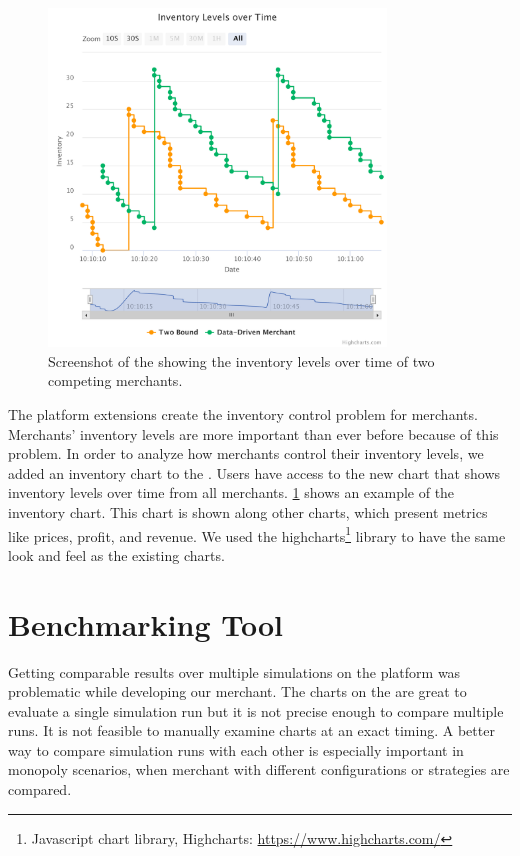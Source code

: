 \begin{figure}[t]
	\centering
	\includegraphics[width=0.8\textwidth]{figures/inventory_graph}
	\caption[Inventory chart on \ui]{Screenshot of the \ui showing the inventory levels over time of two competing merchants.}
	\label{fig:invnetory_graph}
\end{figure}

The platform extensions create the inventory control problem for merchants.
Merchants' inventory levels are more important than ever before because of this problem.
In order to analyze how merchants control their inventory levels, we added an inventory chart to the \ui.
Users have access to the new chart that shows inventory levels over time from all merchants.
\cref{fig:invnetory_graph} shows an example of the inventory chart.
This chart is shown along other charts, which present metrics like prices, profit, and revenue. 
We used the highcharts\footnote{Javascript chart library, Highcharts: \url{https://www.highcharts.com/}} library to have the same look and feel as the existing charts.

\section{Benchmarking Tool}
\label{section:benchmark_tool}
Getting comparable results over multiple simulations on the \pricewars platform was problematic while developing our merchant.
The charts on the \ui are great to evaluate a single simulation run but it is not precise enough to compare multiple runs.
It is not feasible to manually examine charts at an exact timing.
A better way to compare simulation runs with each other is especially important in monopoly scenarios, when merchant with different configurations or strategies are compared.

